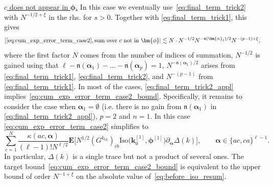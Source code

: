 \documentclass[10pt]{amsart}
\numberwithin{equation}{section}
\newcommand{\E}{\mathbf{E}}
\begin{document}
\noindent\underline{$c$ does not appear in $\bm{\phi}$.} In this case we eventually use~\eqref{eq:final_term_trick2} with $N^{-1/2+\xi}$ in the rhs. for $s>0$. Together with \eqref{eq:final_term_trick1}, this gives
\begin{equation}
|\eqref{eq:cum_exp_error_term_case2}, \text{sum over } c\text{ not in } \bm{\phi}|\lesssim  N \cdot N^{-1/2} N^{-\mathfrak{n}(\bm{\alpha}_1)/2} N^{-(p-1)+\xi}.
\label{eq:final_term_trick2_appl}
\end{equation}
where the first factor $N$ comes from the number of indices of summation, $N^{-1/2}$ is gained using that $\ell-\mathfrak{n}(\bm{\alpha}_1)-\ldots-\mathfrak{n}(\bm{\alpha}_p)=1$, $N^{-\mathfrak{n}(\bm{\alpha}_1)/2}$ arises from \eqref{eq:final_term_trick1}, \eqref{eq:final_term_trick2}, and $N^{-(p-1)}$ from \eqref{eq:final_term_trick1}. In most of the cases, \eqref{eq:final_term_trick2_appl} implies~\eqref{eq:cum_exp_error_term_case2_bound}. Specifically, it remains to consider the case when $\bm{\alpha}_1=\emptyset$ (i.e. there is no gain from $\mathfrak{n}(\bm{\alpha}_1)$ in \eqref{eq:final_term_trick2_appl}), $p=2$ and $n=1$. In this case \eqref{eq:cum_exp_error_term_case2} simplifies to
\begin{equation}
\sum_{c=1}^N\frac{\kappa(ac,\bm{\alpha})}{(\ell-1)!N^{\ell/2}}\E\bigg[N^{1/2}\left(G^{k_{01}}\right)_{cb}\mathrm{Iso}\big(\bm{k}_0^{[1]},\bm{\phi}^{[1]}\big) \partial_{\bm{\alpha}}\Delta(k)\bigg],\qquad \bm{\alpha}\in \{ac,ca\}^{\ell-1}.
\label{eq:before_iso_resum}
\end{equation}
In particular, $\Delta(k)$ is a single trace but not a product of several ones. The target bound~\eqref{eq:cum_exp_error_term_case2_bound} is equivalent to the upper bound of order $N^{-1+\xi}$ on the absolute value of~\eqref{eq:before_iso_resum}.
\end{document}
